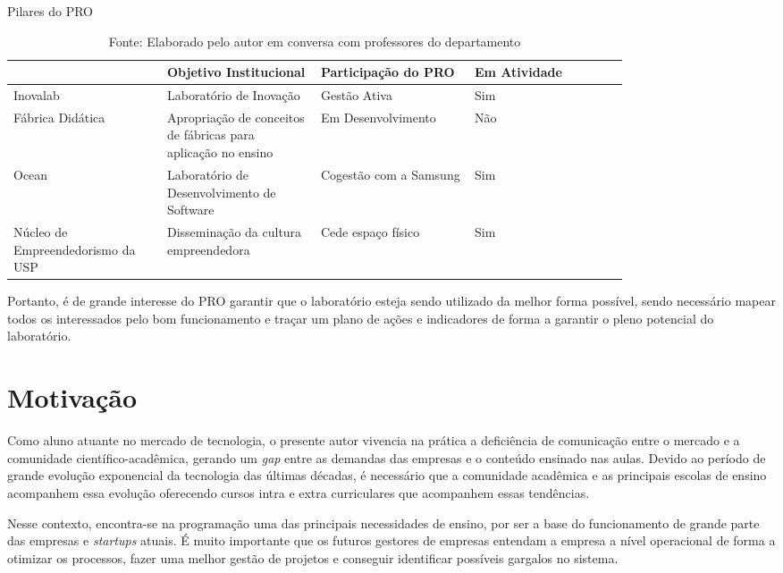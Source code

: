 \begin{table}[h]
\begin{center}
\caption{Pilares do PRO}
\label{tab:pilares_pro}
{\def\arraystretch{2}\tabcolsep=10pt
\begin{tabular}{>{\raggedright}p{0.2\linewidth}>{\raggedright\arraybackslash}p{0.2\linewidth}>{\raggedright\arraybackslash}p{0.2\linewidth}>{\raggedright\arraybackslash}p{0.2\linewidth}}
\hline
     & Objetivo Institucional & Participação do PRO & Em Atividade  \\ \hline
     Inovalab & Laboratório de Inovação & Gestão Ativa & Sim  \\
     Fábrica Didática & Apropriação de conceitos de fábricas para aplicação no ensino & Em Desenvolvimento & Não \\
     Ocean & Laboratório de Desenvolvimento de Software & Cogestão com a Samsung & Sim \\
	 Núcleo de Empreendedorismo da USP & Disseminação da cultura empreendedora & Cede espaço físico & Sim \\ \hline
\end{tabular}%
}
\caption* {Fonte: Elaborado pelo autor em conversa com professores do departamento}
\end{center}
\end{table}

Portanto, é de grande interesse do PRO garantir que o laboratório esteja sendo utilizado da melhor forma possível, sendo necessário mapear todos os interessados pelo bom funcionamento e traçar um plano de ações e indicadores de forma a garantir o pleno potencial do laboratório.

\section{Motivação} %
\label{cha:motivacao}

Como aluno atuante no mercado de tecnologia, o presente autor vivencia na prática a deficiência de comunicação entre o mercado e a comunidade científico-acadêmica, gerando um \textit{gap} entre as demandas das empresas e o conteúdo ensinado nas aulas. Devido ao período de grande evolução exponencial da tecnologia das últimas décadas, é necessário que a comunidade acadêmica e as principais escolas de ensino acompanhem essa evolução oferecendo cursos intra e extra curriculares que acompanhem essas tendências.

Nesse contexto, encontra-se na programação uma das principais necessidades de ensino, por ser a base do funcionamento de grande parte das empresas e \textit{startups} atuais. É muito importante que os futuros gestores de empresas entendam a empresa a nível operacional de forma a otimizar os processos, fazer uma melhor gestão de projetos e conseguir identificar possíveis gargalos no sistema.

